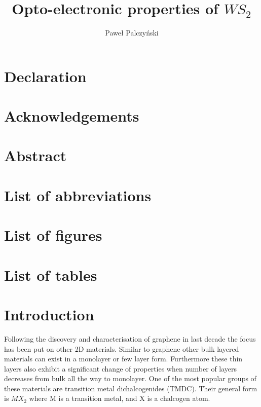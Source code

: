 \documentclass[12pt]{article}
\author{Paweł Palczyński}
\begin{document}

\title{Opto-electronic properties of $WS_2$}

\maketitle

\section*{Declaration}
\section*{Acknowledgements}
\section*{Abstract}
\section*{List of abbreviations}
\section*{List of figures}
\section*{List of tables}
\section{Introduction}
	Following the discovery and characterisation of graphene in last decade the focus has been put on other 2D materials. Similar to graphene other bulk layered materials can exist in a monolayer or few layer form. Furthermore these thin layers also exhibit a significant change of properties when number of layers decreases from bulk all the way to monolayer. One of the most popular groups of these materials are transition metal dichalcogenides (TMDC). Their general form is $MX_2$ where M is a transition metal, and X is a chalcogen atom.  
\end{document}
